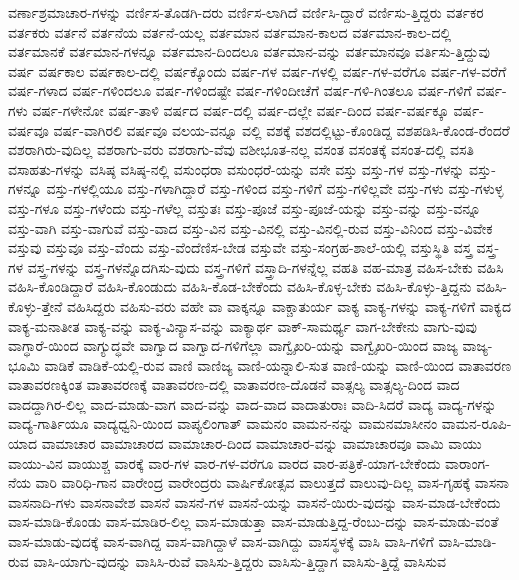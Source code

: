 {ವರ್ಣಾಶ್ರಮಾಚಾರ-ಗಳನ್ನು
ವರ್ಣಿಸ-ತೊಡಗಿ-ದರು
ವರ್ಣಿಸ-ಲಾಗಿದೆ
ವರ್ಣಿಸಿ-ದ್ದಾರೆ
ವರ್ಣಿಸು-ತ್ತಿದ್ದರು
ವರ್ತಕರ
ವರ್ತಕರು
ವರ್ತನೆ
ವರ್ತನೆಯ
ವರ್ತನೆ-ಯಲ್ಲ
ವರ್ತಮಾನ
ವರ್ತಮಾನ-ಕಾಲದ
ವರ್ತಮಾನ-ಕಾಲ-ದಲ್ಲಿ
ವರ್ತಮಾನಕೆ
ವರ್ತಮಾನ-ಗಳನ್ನೂ
ವರ್ತಮಾನ-ದಿಂದಲೂ
ವರ್ತಮಾನ-ವನ್ನು
ವರ್ತಮಾನವೂ
ವರ್ತಿಸು-ತ್ತಿದ್ದುವು
ವರ್ಷ
ವರ್ಷಕಾಲ
ವರ್ಷಕಾಲ-ದಲ್ಲಿ
ವರ್ಷಕ್ಕೊಂದು
ವರ್ಷ-ಗಳ
ವರ್ಷ-ಗಳಲ್ಲಿ
ವರ್ಷ-ಗಳ-ವರೆಗೂ
ವರ್ಷ-ಗಳ-ವರೆಗೆ
ವರ್ಷ-ಗಳಾದ
ವರ್ಷ-ಗಳಿಂದಲೂ
ವರ್ಷ-ಗಳಿಂದಷ್ಟೇ
ವರ್ಷ-ಗಳಿಂದೀಚೆಗೆ
ವರ್ಷ-ಗಳಿ-ಗಿಂತಲೂ
ವರ್ಷ-ಗಳಿಗೆ
ವರ್ಷ-ಗಳು
ವರ್ಷ-ಗಳೇನೋ
ವರ್ಷ-ತಾಳಿ
ವರ್ಷದ
ವರ್ಷ-ದಲ್ಲಿ
ವರ್ಷ-ದಲ್ಲೇ
ವರ್ಷ-ದಿಂದ
ವರ್ಷ-ವರ್ಷಕ್ಕೂ
ವರ್ಷ-ವರ್ಷವೂ
ವರ್ಷ-ವಾಗಿರಲಿ
ವರ್ಷವೂ
ವಲಯ-ವನ್ನೂ
ವಲ್ಲಿ
ವಶಕ್ಕೆ
ವಶದಲ್ಲಿಟ್ಟು-ಕೊಂಡಿದ್ದ
ವಶಪಡಿಸಿ-ಕೊಂಡ-ರೆಂದರೆ
ವಶರಾಗಿರು-ವುದಿಲ್ಲ
ವಶರಾಗು-ವರು
ವಶರಾಗು-ವೆವು
ವಶೀಭೂತ-ನಲ್ಲ
ವಸಂತ
ವಸಂತಕ್ಕೆ
ವಸಂತ-ದಲ್ಲಿ
ವಸತಿ
ವಸಾಹತು-ಗಳನ್ನು
ವಸಿಷ್ಠ
ವಸಿಷ್ಠ-ನಲ್ಲಿ
ವಸುಂಧರಾ
ವಸುಂಧರೆ-ಯನ್ನು
ವಸೇ
ವಸ್ತು
ವಸ್ತು-ಗಳ
ವಸ್ತು-ಗಳನ್ನು
ವಸ್ತು-ಗಳನ್ನೂ
ವಸ್ತು-ಗಳಲ್ಲಿಯೂ
ವಸ್ತು-ಗಳಾಗಿದ್ದಾರೆ
ವಸ್ತು-ಗಳಿಂದ
ವಸ್ತು-ಗಳಿಗೆ
ವಸ್ತು-ಗಳಿಲ್ಲವೇ
ವಸ್ತು-ಗಳು
ವಸ್ತು-ಗಳುಳ್ಳ
ವಸ್ತು-ಗಳೂ
ವಸ್ತು-ಗಳೆಂದು
ವಸ್ತು-ಗಳೆಲ್ಲ
ವಸ್ತುತಃ
ವಸ್ತು-ಪೂಜೆ
ವಸ್ತು-ಪೂಜೆ-ಯನ್ನು
ವಸ್ತು-ವನ್ನು
ವಸ್ತು-ವನ್ನೂ
ವಸ್ತು-ವಾಗಿ
ವಸ್ತು-ವಾಗುವೆ
ವಸ್ತು-ವಾದ
ವಸ್ತು-ವಿನ
ವಸ್ತು-ವಿನಲ್ಲಿ
ವಸ್ತು-ವಿನಲ್ಲಿ-ರುವ
ವಸ್ತು-ವಿನಿಂದ
ವಸ್ತು-ವಿವೇಕ
ವಸ್ತುವು
ವಸ್ತುವೂ
ವಸ್ತು-ವೆಂದು
ವಸ್ತು-ವೆಂದೆಣಿಸ-ಬೇಡ
ವಸ್ತುವೇ
ವಸ್ತು-ಸಂಗ್ರಹ-ಶಾಲೆ-ಯಲ್ಲಿ
ವಸ್ತುಸ್ಥಿತಿ
ವಸ್ತ್ರ
ವಸ್ತ್ರ-ಗಳ
ವಸ್ತ್ರ-ಗಳನ್ನು
ವಸ್ತ್ರ-ಗಳನ್ನೊದಗಿಸು-ವುದು
ವಸ್ತ್ರ-ಗಳಿಗೆ
ವಸ್ತ್ರಾದಿ-ಗಳನ್ನೆಲ್ಲ
ವಹತಿ
ವಹ-ಮಾತ್ರ
ವಹಿಸ-ಬೇಕು
ವಹಿಸಿ
ವಹಿಸಿ-ಕೊಂಡಿದ್ದಾರೆ
ವಹಿಸಿ-ಕೊಂಡುದು
ವಹಿಸಿ-ಕೊಡ-ಬೇಕೆಂದು
ವಹಿಸಿ-ಕೊಳ್ಳ-ಬೇಕು
ವಹಿಸಿ-ಕೊಳ್ಳು-ತ್ತಿದ್ದನು
ವಹಿಸಿ-ಕೊಳ್ಳು-ತ್ತೇನೆ
ವಹಿಸಿದ್ದರು
ವಹಿಸು-ವರು
ವಹೇ
ವಾ
ವಾಕ್ಕನ್ನೂ
ವಾಕ್ಚಾತುರ್ಯ
ವಾಕ್ಯ
ವಾಕ್ಯ-ಗಳನ್ನು
ವಾಕ್ಯ-ಗಳಿಗೆ
ವಾಕ್ಯದ
ವಾಕ್ಯ-ಮನಾತೀತ
ವಾಕ್ಯ-ವನ್ನು
ವಾಕ್ಯ-ವಿನ್ಯಾಸ-ವನ್ನು
ವಾಕ್ಯಾರ್ಥ
ವಾಕ್-ಸಾಮರ್ಥ್ಯ
ವಾಗ-ಬೇಕೇನು
ವಾಗು-ವುವು
ವಾಗ್ಧಾರೆ-ಯಿಂದ
ವಾಗ್ಯುದ್ಧವೇ
ವಾಗ್ವಾದ
ವಾಗ್ವಾದ-ಗಳಿಗೆಲ್ಲಾ
ವಾಗ್ವೈಖರಿ-ಯನ್ನು
ವಾಗ್ವೈಖರಿ-ಯಿಂದ
ವಾಜ್ಯ
ವಾಜ್ಯ-ಭೂಮಿ
ವಾಡಿಕೆ
ವಾಡಿಕೆ-ಯಲ್ಲಿ-ರುವ
ವಾಣಿ
ವಾಣಿಜ್ಯ
ವಾಣಿ-ಯನ್ನಾಲಿ-ಸುತ
ವಾಣಿ-ಯನ್ನು
ವಾಣಿ-ಯಿಂದ
ವಾತಾವರಣ
ವಾತಾವರಣಕ್ಕಿಂತ
ವಾತಾವರಣಕ್ಕೆ
ವಾತಾವರಣ-ದಲ್ಲಿ
ವಾತಾವರಣ-ದೊಡನೆ
ವಾತ್ಸಲ್ಯ
ವಾತ್ಸಲ್ಯ-ದಿಂದ
ವಾದ
ವಾದದ್ದಾಗಿರ-ಲಿಲ್ಲ
ವಾದ-ಮಾಡು-ವಾಗ
ವಾದ-ವನ್ನು
ವಾದ-ವಾದ
ವಾದಾತುರಾಃ
ವಾದಿ-ಸಿದರೆ
ವಾದ್ಯ
ವಾದ್ಯ-ಗಳನ್ನು
ವಾದ್ಯ-ಗಾರ್ತಿಯೂ
ವಾದ್ಯಧ್ವನಿ-ಯಿಂದ
ವಾಪ್ಯಲಿಂಗಾತ್
ವಾಮನಂ
ವಾಮನ-ನನ್ನು
ವಾಮನಮಾಸೀನಂ
ವಾಮನ-ರೂಪಿ-ಯಾದ
ವಾಮಾಚಾರ
ವಾಮಾಚಾರದ
ವಾಮಾಚಾರ-ದಿಂದ
ವಾಮಾಚಾರ-ವನ್ನು
ವಾಮಾಚಾರವೂ
ವಾಮಿ
ವಾಯು
ವಾಯು-ವಿನ
ವಾಯುಶ್ಚ
ವಾರಕ್ಕೆ
ವಾರ-ಗಳ
ವಾರ-ಗಳ-ವರೆಗೂ
ವಾರದ
ವಾರ-ಪತ್ರಿಕೆ-ಯಾಗ-ಬೇಕೆಂದು
ವಾರಾಂಗ-ನೆಯ
ವಾರಿ
ವಾರಿಧಿ-ಗಾನ
ವಾರೇಂದ್ರ
ವಾರೇಂದ್ರರು
ವಾರ್ಷಿಕೋತ್ಸವ
ವಾಲುತ್ತದೆ
ವಾಲುವು-ದಿಲ್ಲ
ವಾಸ-ಗೃಹಕ್ಕೆ
ವಾಸನಾ
ವಾಸನಾದಿ-ಗಳು
ವಾಸನಾವೇಶ
ವಾಸನೆ
ವಾಸನೆ-ಗಳ
ವಾಸನೆ-ಯನ್ನು
ವಾಸನೆ-ಯಿರು-ವುದನ್ನು
ವಾಸ-ಮಾಡ-ಬೇಕೆಂದು
ವಾಸ-ಮಾಡಿ-ಕೊಂಡು
ವಾಸ-ಮಾಡಿರ-ಲಿಲ್ಲ
ವಾಸ-ಮಾಡುತ್ತಾ
ವಾಸ-ಮಾಡುತ್ತಿದ್ದ-ರೆಂಬು-ದನ್ನು
ವಾಸ-ಮಾಡು-ವಂತೆ
ವಾಸ-ಮಾಡು-ವುದಕ್ಕೆ
ವಾಸ-ವಾಗಿದ್ದ
ವಾಸ-ವಾಗಿದ್ದಾಳೆ
ವಾಸ-ವಾಗಿದ್ದು
ವಾಸಸ್ಥಳಕ್ಕೆ
ವಾಸಿ
ವಾಸಿ-ಗಳಿಗೆ
ವಾಸಿ-ಮಾಡಿ-ರುವ
ವಾಸಿ-ಯಾಗು-ವುದನ್ನು
ವಾಸಿಸಿ-ರುವೆ
ವಾಸಿಸು-ತ್ತಿದ್ದರು
ವಾಸಿಸು-ತ್ತಿದ್ದಾಗ
ವಾಸಿಸು-ತ್ತಿದ್ದೆ
ವಾಸಿಸುವ
}
